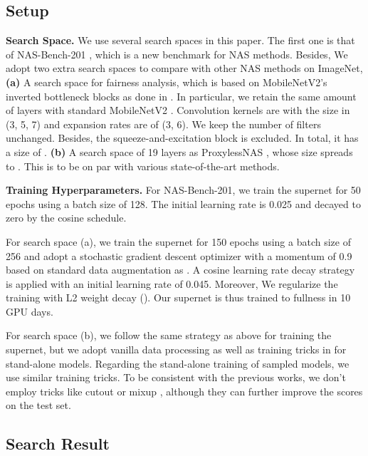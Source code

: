 \documentclass[10pt,twocolumn,letterpaper]{article}
\theoremstyle{definition}
\begin{document}
\subsection{Setup}\label{ex:v2}
\textbf{Search Space.}
We use several search spaces in this paper. The first one is that of NAS-Bench-201 \cite{dong2019bench}, which is a new benchmark for NAS methods. Besides,
We adopt two extra search spaces to compare with other NAS methods on ImageNet, \textbf{(a)}
A search space for fairness analysis, which is based on MobileNetV2's inverted bottleneck blocks as done in \cite{cai2018proxylessnas}. In particular, we retain the same amount of layers with standard MobileNetV2 \cite{sandler2018mobilenetv2}. Convolution kernels are with the size in (3, 5, 7) and expansion rates are of (3, 6). We keep the number of filters unchanged. Besides, the squeeze-and-excitation block \cite{hu2018squeeze} is excluded.  In total, it has a size of .   \textbf{(b)} A search space of 19 layers as ProxylessNAS \cite{cai2018proxylessnas}, whose size spreads to . This is to be on par with various state-of-the-art methods. 


\textbf{Training Hyperparameters.}
For NAS-Bench-201, we train the supernet for 50 epochs using a batch size of 128. The initial learning rate is 0.025 and decayed to zero by the cosine schedule.

For search space (a), we train the supernet for 150 epochs using a batch size of 256 and adopt a stochastic gradient descent optimizer with a momentum of 0.9 \cite{sutskever2013importance} based on standard data augmentation as \cite{sandler2018mobilenetv2}. A cosine learning rate decay strategy \cite{loshchilov2016sgdr} is applied with an initial learning rate of 0.045.  Moreover, We regularize the training with L2 weight decay ().  Our supernet is thus trained to fullness in 10 GPU days. 

For search space (b), we follow the same strategy as above for training the supernet, but we adopt vanilla data processing as well as training tricks in \cite{tan2018mnasnet} for stand-alone models. Regarding the stand-alone training of sampled models, we use  similar training tricks. To be consistent with the previous works, we don't employ tricks like  cutout \cite{devries2017improved} or mixup \cite{zhang2018mixup}, although they can further improve the scores on the test set.

\subsection{Search Result}
\label{sec:sota}
\end{document}
